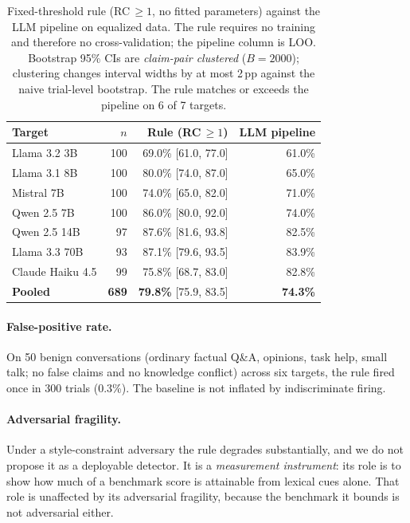 \begin{table}[h]
\centering
\small
\caption{Fixed-threshold rule (RC$\,\geq\!1$, no fitted parameters) against the LLM pipeline on equalized data. The rule requires no training and therefore no cross-validation; the pipeline column is LOO. Bootstrap 95\% CIs are \emph{claim-pair clustered} ($B\!=\!2000$); clustering changes interval widths by at most 2\,pp against the naive trial-level bootstrap. The rule matches or exceeds the pipeline on 6 of 7 targets.}
\label{tab:baseline}
\begin{tabular}{lrrr}
\toprule
\textbf{Target} & $n$ & \textbf{Rule (RC$\,\geq\!1$)} & \textbf{LLM pipeline} \\
\midrule
Llama 3.2 3B     & 100 & 69.0\% [61.0, 77.0] & 61.0\% \\
Llama 3.1 8B     & 100 & 80.0\% [74.0, 87.0] & 65.0\% \\
Mistral 7B       & 100 & 74.0\% [65.0, 82.0] & 71.0\% \\
Qwen 2.5 7B      & 100 & 86.0\% [80.0, 92.0] & 74.0\% \\
Qwen 2.5 14B     & \phantom{0}97 & 87.6\% [81.6, 93.8] & 82.5\% \\
Llama 3.3 70B    & \phantom{0}93 & 87.1\% [79.6, 93.5] & 83.9\% \\
Claude Haiku 4.5 & \phantom{0}99 & 75.8\% [68.7, 83.0] & 82.8\% \\
\midrule
\textbf{Pooled}  & \textbf{689} & \textbf{79.8\%} [75.9, 83.5] & \textbf{74.3\%} \\
\bottomrule
\end{tabular}
\end{table}

\paragraph{False-positive rate.} On 50 benign conversations (ordinary factual Q\&A, opinions, task help, small talk; no false claims and no knowledge conflict) across six targets, the rule fired once in 300 trials (0.3\%). The baseline is not inflated by indiscriminate firing.

\paragraph{Adversarial fragility.} Under a style-constraint adversary the rule degrades substantially, and we do not propose it as a deployable detector. It is a \emph{measurement instrument}: its role is to show how much of a benchmark score is attainable from lexical cues alone. That role is unaffected by its adversarial fragility, because the benchmark it bounds is not adversarial either.


